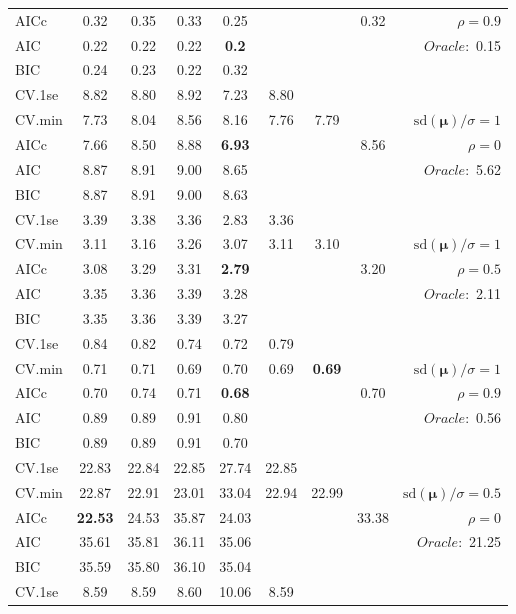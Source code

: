 \begin{table}
\begin{center}
\begin{tabular}{l*{7}{c}|r}
AICc & 0.32 & 0.35 & 0.33 & 0.25 & & & 0.32 &  $\rho=0.9$ \\
AIC & 0.22 & 0.22 & 0.22 & {\bf 0.2} & & & &  \multirow{2}{*}{$Oracle: $ 0.15} \\
BIC & 0.24 & 0.23 & 0.22 & 0.32 & & & &  \\
 \hline 
CV.1se & 8.82 & 8.80 & 8.92 & 7.23 & 8.80 & & & \\
CV.min & 7.73 & 8.04 & 8.56 & 8.16 & 7.76 & 7.79 & & $\mathrm{sd}(\mathbf{\mu})/\sigma=1$ \\
AICc & 7.66 & 8.50 & 8.88 & {\bf 6.93} & & & 8.56 &  $\rho=0$ \\
AIC & 8.87 & 8.91 & 9.00 & 8.65 & & & &  \multirow{2}{*}{$Oracle: $ 5.62} \\
BIC & 8.87 & 8.91 & 9.00 & 8.63 & & & &  \\
 \hline 
CV.1se & 3.39 & 3.38 & 3.36 & 2.83 & 3.36 & & & \\
CV.min & 3.11 & 3.16 & 3.26 & 3.07 & 3.11 & 3.10 & & $\mathrm{sd}(\mathbf{\mu})/\sigma=1$ \\
AICc & 3.08 & 3.29 & 3.31 & {\bf 2.79} & & & 3.20 &  $\rho=0.5$ \\
AIC & 3.35 & 3.36 & 3.39 & 3.28 & & & &  \multirow{2}{*}{$Oracle: $ 2.11} \\
BIC & 3.35 & 3.36 & 3.39 & 3.27 & & & &  \\
 \hline 
CV.1se & 0.84 & 0.82 & 0.74 & 0.72 & 0.79 & & & \\
CV.min & 0.71 & 0.71 & 0.69 & 0.70 & 0.69 & {\bf 0.69} & & $\mathrm{sd}(\mathbf{\mu})/\sigma=1$ \\
AICc & 0.70 & 0.74 & 0.71 & {\bf 0.68} & & & 0.70 &  $\rho=0.9$ \\
AIC & 0.89 & 0.89 & 0.91 & 0.80 & & & &  \multirow{2}{*}{$Oracle: $ 0.56} \\
BIC & 0.89 & 0.89 & 0.91 & 0.70 & & & &  \\
 \hline 
CV.1se & 22.83 & 22.84 & 22.85 & 27.74 & 22.85 & & & \\
CV.min & 22.87 & 22.91 & 23.01 & 33.04 & 22.94 & 22.99 & & $\mathrm{sd}(\mathbf{\mu})/\sigma=0.5$ \\
AICc & {\bf 22.53} & 24.53 & 35.87 & 24.03 & & & 33.38 &  $\rho=0$ \\
AIC & 35.61 & 35.81 & 36.11 & 35.06 & & & &  \multirow{2}{*}{$Oracle: $ 21.25} \\
BIC & 35.59 & 35.80 & 36.10 & 35.04 & & & &  \\
 \hline 
CV.1se & 8.59 & 8.59 & 8.60 & 10.06 & 8.59 & & & \\

\end{tabular}
\end{center}
\end{table}
